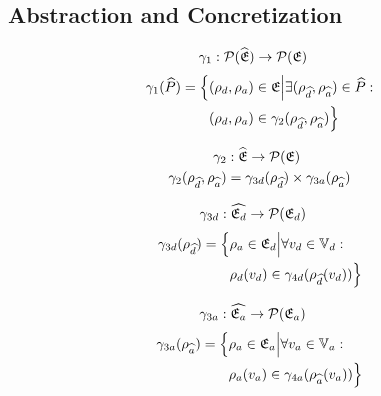 \subsection{Abstraction and Concretization}\label{subsec:abstraction-and-concretization}

\begin{align}
    \gamma_1 &: \mathcal{P}(\widehat{\mathfrak{E}}) \rightarrow \mathcal{P}(\mathfrak{E})
\end{align}
\begin{align}
    \begin{split}
        \gamma_1(\widehat{P}) = \Bigl\{ &(\rho_{d}, \rho_{a}) \in \mathfrak{E} \Big| \exists (\rho_{\widehat{d}}, \rho_{\widehat{a}}) \in \widehat{P} :\\
        &(\rho_{d}, \rho_{a}) \in \gamma_2(\rho_{\widehat{d}}, \rho_{\widehat{a}})\Bigr\}
    \end{split}
\end{align}

\begin{align}
    \gamma_2 &: \widehat{\mathfrak{E}} \rightarrow \mathcal{P}(\mathfrak{E}) \\
    \gamma_2(\rho_{\widehat{d}}, \rho_{\widehat{a}}) &= \gamma_{3d}(\rho_{\widehat{d}}) \times \gamma_{3a}(\rho_{\widehat{a}})
\end{align}

\begin{align}
    \gamma_{3d} &: \widehat{\mathfrak{E}_d} \rightarrow \mathcal{P}(\mathfrak{E}_d)
\end{align}
\begin{align}
    \begin{split}
        \gamma_{3d}(\rho_{\widehat{d}}) = \Bigl\{ &\rho_{a} \in \mathfrak{E}_d \Big| \forall v_d \in \mathbb{V}_d :\\
        &\rho_d(v_d) \in \gamma_{4d}(\rho_{\widehat{d}}(v_d)) \Bigr\}
    \end{split}
\end{align}

\begin{align}
    \gamma_{3a} &: \widehat{\mathfrak{E}_a} \rightarrow \mathcal{P}(\mathfrak{E}_a)
\end{align}
\begin{align}
    \begin{split}
        \gamma_{3a}(\rho_{\widehat{a}}) = \Bigl\{ &\rho_{a} \in \mathfrak{E}_a \Big| \forall v_a \in \mathbb{V}_a : \\
        &\rho_a(v_a) \in \gamma_{4a}(\rho_{\widehat{a}}(v_a)) \Bigr\}
    \end{split}
\end{align}

